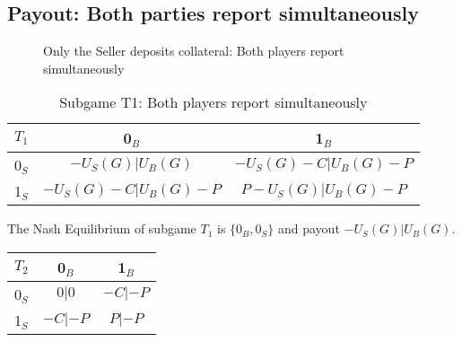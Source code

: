 \documentclass{cacthesis}
\begin{document}
\subsection{Payout: Both parties report simultaneously}
\begin{figure}[htb!]
    \centering
    \caption{Only the Seller deposits collateral: Both players report simultaneously}
\end{figure}

\begin{table}[htb!]
    \centering
    \begin{tabular}{ c||c|c| }
    $T_1$& 0$_B$ & 1$_B$   \\
    \hline
    \hline
    0$_S$ & $-U_S(G) | U_B(G)$ & $-U_S(G) - C | U_B(G) - P$ \\
    \hline
    1$_S$ & $-U_S(G) - C | U_B(G) - P$ & $P - U_S(G) | U_B(G) - P$\\ 
    \hline
    \end{tabular}
    \caption{Subgame T1: Both players report simultaneously}
\end{table}

The Nash Equilibrium of subgame $T_1$ is $\{0_B, 0_S\}$ and payout $-U_S(G) | U_B(G)$.
\begin{center}
    \begin{tabular}{ c||c|c| }
    $T_2$& 0$_B$ & 1$_B$   \\
    \hline
    \hline
    0$_S$ & $0 | 0$ & $-C|-P$ \\
    \hline
    1$_S$ & $-C|-P$ & $P | -P$\\ 
    \hline
    \end{tabular}
\end{center}
\end{document}
